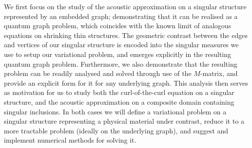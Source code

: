 We first focus on the study of the acoustic approximation on a singular structure represented by an embedded graph; demonstrating that it can be realised as a quantum graph problem, which coincides with the known limit of analogous equations on shrinking thin structures.
The geometric contrast between the edges and vertices of our singular structure is encoded into the singular measures we use to setup our variational problem, and emerges explicitly in the resulting quantum graph problem.
Furthermore, we also demonstrate that the resulting problem can be readily analysed and solved through use of the $M$-matrix, and provide an explicit form for it for any underlying graph.
This analysis then serves as motivation for us to study both the curl-of-the-curl equation on a singular structure, and the acoustic approximation on a composite domain containing singular inclusions.
In both cases we will define a variational problem on a singular structure representing a physical material under contrast, reduce it to a more tractable problem (ideally on the underlying graph), and suggest and implement numerical methods for solving it.